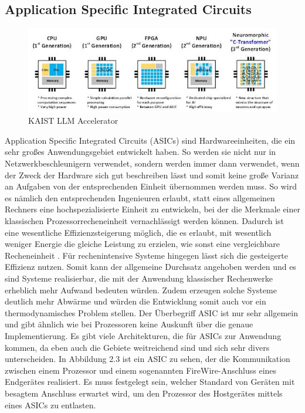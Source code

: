 \subsection{Application Specific Integrated Circuits}
\begin{figure}
    \centering
    \includegraphics[width=0.8\linewidth]{images/lowpowerasic.png}
    \caption{KAIST LLM Accelerator \cite{kaist}}
    \label{fig:enter-label}
\end{figure}
Application Specific Integrated Circuits (ASICs) sind Hardwareeinheiten, die ein sehr großes Anwendungsgebiet entwickelt haben. So werden sie nicht nur in Netzwerkbeschleunigern verwendet, sondern werden immer dann verwendet, wenn der Zweck der Hardware sich gut beschreiben lässt und somit keine große Varianz an Aufgaben von der entsprechenden Einheit übernommen werden muss. So wird es nämlich den entsprechenden Ingenieuren erlaubt, statt eines allgemeinen Rechners eine hochspezialisierte Einheit zu entwickeln, bei der die Merkmale einer klassischen Prozessorrecheneinheit vernachlässigt werden können. Dadurch ist eine wesentliche Effizienzsteigerung möglich, die es erlaubt, mit wesentlich weniger Energie die gleiche Leistung zu erzielen, wie sonst eine vergleichbare Recheneinheit \cite{asic}. Für rechenintensive Systeme hingegen lässt sich die gesteigerte Effizienz nutzen. Somit kann der allgemeine Durchsatz angehoben werden und es sind Systeme realisierbar, die mit der Anwendung klassischer Rechenwerke erheblich mehr Aufwand bedeuten würden. Zudem erzeugen solche Systeme deutlich mehr Abwärme und würden die Entwicklung somit auch vor ein thermodynamisches Problem stellen. Der Überbegriff ASIC ist nur sehr allgemein und gibt ähnlich wie bei Prozessoren keine Auskunft über die genaue Implementierung. Es gibt viele Architekturen, die für ASICs zur Anwendung kommen, da eben auch die Gebiete weitreichend sind und sich sehr divers unterscheiden. In Abbildung 2.3 ist ein ASIC zu sehen, der die Kommunikation zwischen einem Prozessor und einem sogenannten FireWire-Anschluss eines Endgerätes realisiert. Es muss festgelegt sein, welcher Standard von Geräten mit besagtem Anschluss erwartet wird, um den Prozessor des Hostgerätes mittels eines ASICs zu entlasten.
\newline

